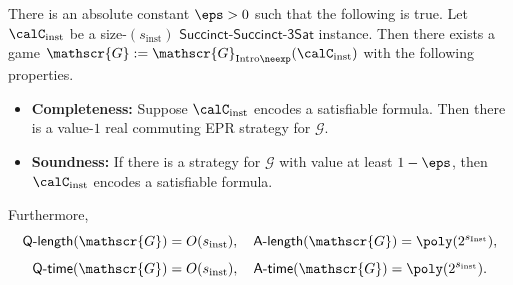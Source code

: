 \documentclass[11pt]{article}
\newcommand{\succinctsquared}{\mathsf{Succinct}\text{-}\mathsf{Succinct}\text{-}\mathsf{3Sat}}
\newcommand{\game}{\mathscr{G}}
\newcommand{\qtime}[1]{\mathsf{Q}\textnormal{-}\mathsf{time}(#1)}
\newcommand{\atime}[1]{\mathsf{A}\textnormal{-}\mathsf{time}(#1)}
\newcommand{\qlength}[1]{\mathsf{Q}\textnormal{-}\mathsf{length}(#1)}
\newcommand{\alength}[1]{\mathsf{A}\textnormal{-}\mathsf{length}(#1)}
\begin{document}
\begin{corollary}\label{cor:succinct-sat-protocol-with-big-answer-size}
There is an absolute constant $\eps > 0$ such that the following is true.
Let $\calC_{\mathrm{inst}}$ be a size-$(s_{\mathrm{inst}})$ $\succinctsquared$ instance.
Then there exists a game $\game := \game_{\mathrm{Intro}\neexp}(\calC_{\mathrm{inst}})$ with the following properties.
\begin{itemize}
\item[$\circ$] \textbf{Completeness:}
		Suppose $\calC_{\mathrm{inst}}$ encodes a satisfiable formula.
		Then there is a value-$1$ real commuting EPR strategy for $\game$.
\item[$\circ$] \textbf{Soundness:}
		If there is a strategy for $\game$ with value at least $1-\eps$,
		then $\calC_{\mathrm{inst}}$ encodes a satisfiable formula.
\end{itemize}
Furthermore,
\begin{equation*}
\qlength{\game} = O(s_{\mathrm{inst}}), \quad
\alength{\game} = \poly(2^{s_{\mathrm{Inst}}}),
\end{equation*}
\begin{equation*}
\qtime{\game} = O(s_{\mathrm{inst}}), \quad
\atime{\game} = \poly(2^{s_{\mathrm{inst}}}).
\end{equation*}
\end{corollary}
\end{document}
